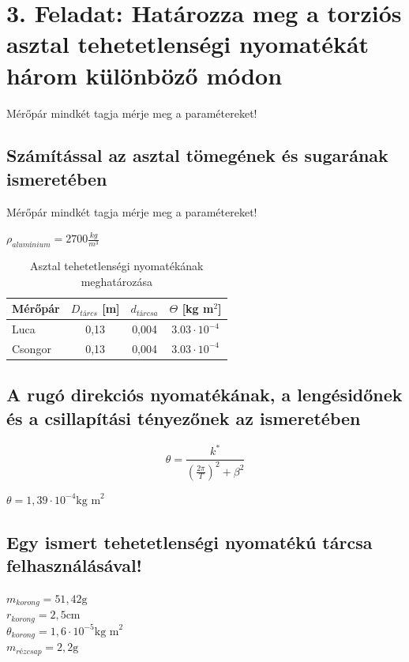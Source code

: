 \documentclass{article}
\begin{document}
\section*{3. Feladat: Határozza meg a torziós asztal tehetetlenségi nyomatékát három különböző módon}

Mérőpár mindkét tagja mérje meg a paramétereket!


\renewcommand{\thesubsection}{\alph{subsection})} %
\subsection{Számítással az asztal tömegének és sugarának ismeretében}

Mérőpár mindkét tagja mérje meg a paramétereket!

$\rho_{alumínium} = 2700 \frac{kg}{m^3}$

\begin{table}[H]
    \centering
    \renewcommand{\arraystretch}{1.2}
    \begin{tabular}{|l|c|c|c|}
        \hline
        Mérőpár & $D_{tárcs}$ [m] & $d_{tárcsa}$ & $\Theta$ [kg m$^2$] \\ \hline
        Luca& 0,13 & 0,004 & $3.03 \cdot 10^{-4}$ \\ \hline
        Csongor& 0,13 & 0,004 & $3.03 \cdot 10^{-4}$ \\ \hline
    \end{tabular}
    \caption{Asztal tehetetlenségi nyomatékának meghatározása}
    \label{tab:hotan_2}
\end{table}


\subsection{A rugó direkciós nyomatékának, a lengésidőnek és a csillapítási tényezőnek az ismeretében}

\[
\theta = \frac{k^{*}}{(\frac{2\pi}{T})^2 + \beta^2}
\]

$\theta= 1,39 \cdot 10^{-4} \text{kg m}^2$

\subsection{Egy ismert tehetetlenségi nyomatékú tárcsa felhasználásával!}

$m_{korong} = 51,42 \text{g}$ \\
$r_{korong} = 2,5 \text{cm}$ \\
$\theta_{korong} = 1,6 \cdot 10^{-5} \text{kg m}^2$ \\
$m_{rézcsap} = 2,2 \text{g}$
\end{document}
